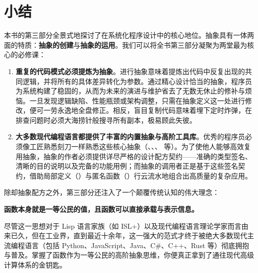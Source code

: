 
\chapter{小结}
\label{sec:ch18_summary}

本书的第三部分全景式地探讨了在系统化程序设计中的核心地位。抽象具有一体两面的特质：\textbf{抽象的创建}与\textbf{抽象的运用}。我们可以将全书第三部分凝聚为两堂最为核心的必修课：

\begin{enumerate}
  \item \textbf{重复的代码模式必须提炼为抽象}。进行抽象意味着提炼出代码中反复出现的共同逻辑，并将所有的具体差异转化为参数。通过精心设计恰当的抽象，程序员为系统构建了稳固的，从而为未来的演进与维护省去了无数无休止的修补与烦恼。一旦发现逻辑缺陷、性能瓶颈或架构调整，只需在抽象定义这一处进行修改，便可一劳永逸地全盘修正。相反，盲目复制代码意味着埋下定时炸弹，在排查问题时必须大海捞针般搜寻所有副本，极易顾此失彼。
  \item \textbf{大多数现代编程语言都提供了丰富的内置抽象与高阶工具库}。优秀的程序员必须像工匠熟悉刻刀一样熟悉这些核心抽象（、、、 等）。为了使他人能够高效复用抽象，抽象的作者必须提供详尽严格的设计配方契约——准确的类型签名、清晰的目的说明以及完备的功能用例；而抽象的调用者正是基于这些签名契约，借助局部定义（）与匿名函数（）行云流水地组合出高质量的复杂应用。
\end{enumerate}

除却抽象配方之外，第三部分还注入了一个颠覆传统认知的伟大理念：
\begin{center}
  \textbf{\large\color{NavyTheme}函数本身就是一等公民的值，且函数可以直接承载与表示信息。}
\end{center}

尽管这一思想对于 Lisp 语言家族（如 ISL+）以及现代编程语言理论学家而言由来已久，但在工业界，直到最近十余年，这一强大的范式才终于被绝大多数现代主流编程语言（包括 Python、JavaScript、Java、C\#、C++、Rust 等）彻底拥抱与普及。掌握了函数作为一等公民的高阶抽象思维，你便真正拿到了通往现代高级计算体系的金钥匙。
